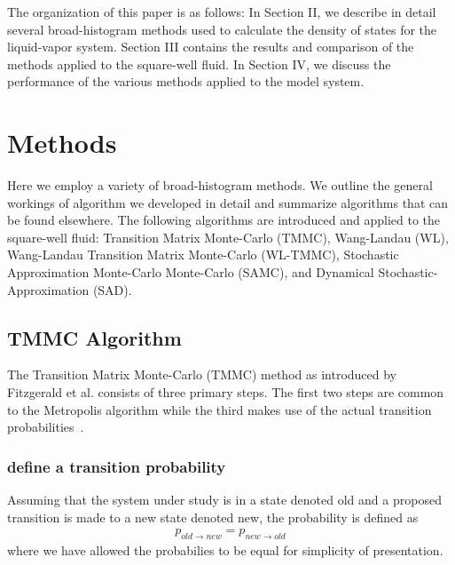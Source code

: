 \documentclass[letterpaper,twocolumn,amsmath,amssymb,pre,aps,10pt]{revtex4-1}
\begin{document}
The organization of this paper is as follows: In Section II, we
describe in detail several broad-histogram methods used to calculate
the density of states for the liquid-vapor system.  Section III
contains the results and comparison of the methods applied to the
square-well fluid.  In Section IV, we discuss the performance of the
various methods applied to the model system.

\section{Methods}

Here we employ a variety of broad-histogram methods.  We outline the
general workings of algorithm we developed in detail and summarize
algorithms that can be found elsewhere.  The following algorithms are
introduced and applied to the square-well fluid:  Transition
Matrix Monte-Carlo (TMMC), Wang-Landau (WL), Wang-Landau Transition
Matrix Monte-Carlo (WL-TMMC), Stochastic Approximation Monte-Carlo
Monte-Carlo (SAMC), and Dynamical Stochastic-Approximation (SAD).

\subsection{TMMC Algorithm}
The Transition Matrix Monte-Carlo (TMMC) method as introduced by Fitzgerald et al.
consists of three primary steps.  The first two steps are common to the Metropolis
algorithm while the third makes use of the actual transition
probabilities~\cite{fitzgerald2000monte}.

\subsubsection{define a transition probability}
Assuming that the system under study is in a state denoted old and a
proposed transition is made to a new state denoted new, the probability
is defined as
\begin{align}
  p_{old \rightarrow new} = p_{new \rightarrow old}
\end{align}
where we have allowed the probabilies to be equal for simplicity of presentation.
\end{document}
